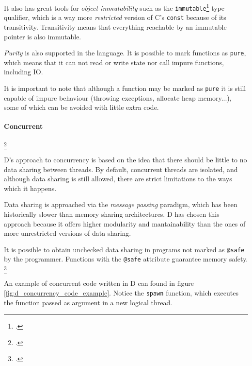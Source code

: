 It also has great tools for \emph{object immutability} such as the \texttt{immutable}\footcite{type_qualifiers_in_d} type qualifier, which is a way more \textit{restricted} version of C's \texttt{const} because of its transitivity. Transitivity means that everything reachable by an immutable pointer is also immutable.

\emph{Purity} is also supported in the language. It is possible to mark functions as \texttt{pure}, which means that it can not read or write state nor call impure functions, including IO.

It is important to note that although a function may be marked as \texttt{pure} it is still capable of impure behaviour (throwing exceptions, allocate heap memory...), some of which can be avoided with little extra code.

\paragraph{Concurrent}\footcite{the_d_programming_language}

D's approach to concurrency is based on the idea that there should be little to no data sharing between threads. By default, concurrent threads are isolated, and although data sharing is still allowed, there are strict limitations to the ways which it happens.

Data sharing is approached via the \textit{message passing} paradigm, which has been historically slower than memory sharing architectures. D has chosen this approach because it offers higher modularity and mantainability than the ones of more unrestricted versions of data sharing.

It is possible to obtain unchecked data sharing in programs not marked as \texttt{@safe} by the programmer. Functions with the \texttt{@safe} attribute guarantee memory safety.
\footcite{memory_safety_in_d}

An example of concurrent code written in D can found in figure  \ref{fig:d_concurrency_code_example}. Notice the \texttt{spawn} function, which executes the function passed as argument in a new logical thread.

